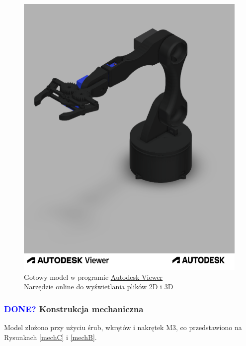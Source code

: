 \documentclass[11pt,titlepage,a4paper]{article}
\begin{document}
\begin{figure}[p]
    \vspace{1cm}
    \begin{center}
        \includegraphics[width=\textwidth]{img/Robak v25.f3d.png}
    \end{center}
    \caption{
        Gotowy model w programie
        \href{https://viewer.autodesk.com/}
        {\underline{Autodesk Viewer}} \\ Narzędzie online do wyświetlania plików 2D i 3D}
    \label{AutodeskViewer}
\end{figure}

\newpage

\subsubsection{\textcolor{blue}{DONE?} Konstrukcja mechaniczna}

Model złożono przy użyciu śrub, wkrętów i nakrętek M3, co przedstawiono na Rysunkach \ref{mechC} i \ref{mechB}.
\end{document}
